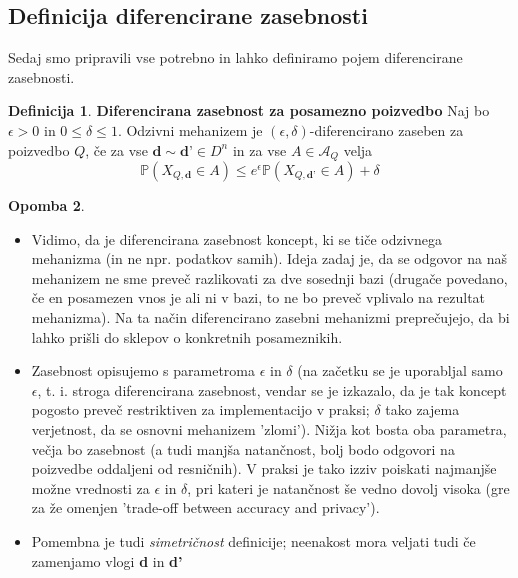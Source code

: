 \documentclass[12pt,a4paper]{amsart}
\theoremstyle{definition} %
\newtheorem{definicija}{Definicija}[section]
\newtheorem{opomba}[definicija]{Opomba}
\theoremstyle{plain} %
\begin{document}
\subsection{Definicija diferencirane zasebnosti}
Sedaj smo pripravili vse potrebno in lahko definiramo pojem diferencirane zasebnosti.

\begin{definicija}{\textbf{Diferencirana zasebnost za posamezno poizvedbo}}
Naj bo $\epsilon > 0$ in $0 \leq \delta \leq 1 $. Odzivni mehanizem je $(\epsilon, \delta)$-diferencirano zaseben za poizvedbo $Q$, če za vse $\textbf{d} \sim \textbf{d'} \in D^n$  in za vse $A\in\mathcal{A}_{Q}$ velja 
\begin{equation}\label{diferen}
\mathbb{P}(X_{Q,\textbf{d}} \in A) \leq e^\epsilon \mathbb{P}(X_{Q,\textbf{d'}} \in A) + \delta \tag{4}
\end{equation}
\end{definicija}
\begin{opomba} 
\begin{itemize}
\item Vidimo, da je diferencirana zasebnost koncept, ki se tiče odzivnega mehanizma (in ne npr. podatkov samih). Ideja zadaj je, da se odgovor na naš mehanizem ne sme preveč razlikovati za dve sosednji bazi (drugače povedano, če en posamezen vnos je ali ni v bazi, to ne bo preveč vplivalo na rezultat mehanizma). Na ta način diferencirano zasebni mehanizmi preprečujejo, da bi lahko prišli do sklepov o konkretnih posameznikih. 
\item Zasebnost opisujemo s parametroma $\epsilon$ in $\delta$ (na začetku se je uporabljal samo $\epsilon$, t. i. stroga diferencirana zasebnost, vendar se je izkazalo, da je tak koncept pogosto preveč restriktiven za implementacijo v praksi; $\delta$ tako zajema verjetnost, da se osnovni mehanizem 'zlomi'). Nižja kot bosta oba parametra, večja bo zasebnost (a tudi manjša natančnost, bolj bodo odgovori na poizvedbe oddaljeni od resničnih). V praksi je tako izziv poiskati najmanjše možne vrednosti za $\epsilon$ in $\delta$, pri kateri je natančnost še vedno dovolj visoka (gre za že omenjen 'trade-off between accuracy and privacy').
\item Pomembna je tudi \textit{simetričnost} definicije; neenakost mora veljati tudi če zamenjamo vlogi \textbf{d} in \textbf{d'}
\end{itemize}
\end{opomba}
\end{document}
